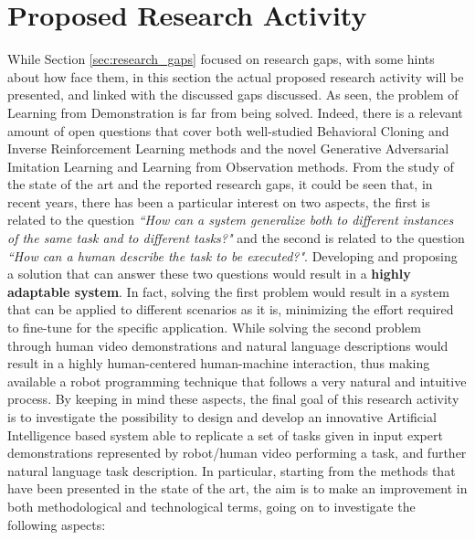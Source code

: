 \section{Proposed Research Activity}
\label{sec:research_activity}
While Section \ref{sec:research_gaps} focused on research gaps, with some hints about how face them, in this section the actual proposed research activity will be presented, and linked with the discussed gaps discussed. 
\newline As seen, the problem of Learning from Demonstration is far from being solved. Indeed, there is a relevant amount of open questions that cover both well-studied Behavioral Cloning and Inverse Reinforcement Learning methods and the novel Generative Adversarial Imitation Learning and Learning from Observation methods. 
From the study of the state of the art and the reported research gaps, it could be seen that, in recent years, there has been a particular interest on two aspects,  
the first is related to the question \textit{``How can a system generalize both to different instances of the same task and to different tasks?"} and the second is related to the question \textit{``How can a human describe the task to be executed?"}. Developing and proposing a solution that can answer these two questions would result in a \textbf{highly adaptable system}. In fact, solving the first problem would result in a system that can be applied to different scenarios as it is, minimizing the effort required to fine-tune for the specific application. While solving the second problem through human video demonstrations and natural language descriptions would result in a highly human-centered human-machine interaction, thus making available a robot programming technique that follows a very natural and intuitive process. By keeping in mind these aspects, the final goal of this research activity is to investigate the possibility to design and develop an innovative Artificial Intelligence based system able to replicate a set of tasks given in input expert demonstrations represented by robot/human video performing a task, and further natural language task description. In particular, starting from the methods that have been presented in the state of the art, the aim is to make an improvement in both methodological and technological terms, going on to investigate the following aspects:

